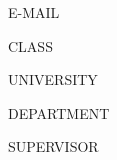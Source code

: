{\begin{titlepage}
\begin{changemargin}{0.0cm}{0.0cm}
            \color{htwgrau}
            \normalsize
            \textsf{E-MAIL}\\
            \color{black}
            \large
            \textsf{\theemail{}}
    
    
            \vfill

            \color{htwgrau}
            \normalsize
            \textsf{CLASS}\\
            \color{black}
            \large
            \textsf{\theclass}
    
            \color{htwgrau}
            \normalsize
            \textsf{UNIVERSITY}\\
            \color{black}
            \large
            \textsf{\theuniversity}
            
            \color{htwgrau}
            \normalsize
            \textsf{DEPARTMENT}\\
            \color{black}
            \large
            \textsf{\thedepartment}
    
            \color{htwgrau}
            \normalsize
            \textsf{SUPERVISOR}\\
            \color{black}
            \large
            \textsf{\thesupervisor}
        \end{changemargin}
        


    \end{titlepage}
}